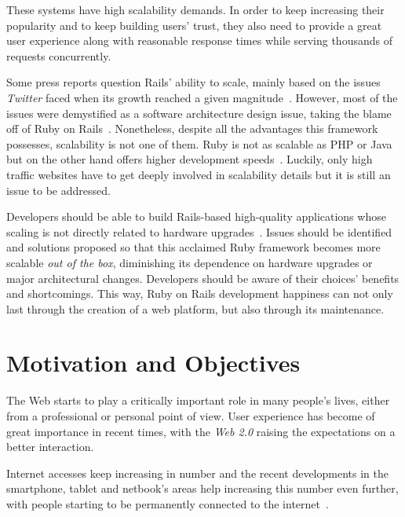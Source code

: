 These systems have high scalability demands. In order to keep increasing their popularity and to keep building users' trust, they also need to provide a great user experience along with reasonable response times while serving thousands of requests concurrently.

Some press reports question Rails' ability to scale, mainly based on the issues \textit{Twitter} faced when its growth reached a given magnitude~\cite{interview_alex_payne}. However, most of the issues were demystified as a software architecture design issue, taking the blame off of Ruby on Rails~\cite{ror_ecosystem_whitepaper}. Nonetheless, despite all the advantages this framework possesses, scalability is not one of them. Ruby is not as scalable as PHP or Java but on the other hand offers higher development speeds~\cite{issues_web_frameworks}. Luckily, only high traffic websites have to get deeply involved in scalability details but it is still an issue to be addressed.

Developers should be able to build Rails-based high-quality applications whose scaling is not directly related to hardware upgrades~\cite{interview_alex_payne}. Issues should be identified and solutions proposed so that this acclaimed Ruby framework becomes more scalable \textit{out of the box}, diminishing its dependence on hardware upgrades or major architectural changes. Developers should be aware of their choices' benefits and shortcomings. This way, Ruby on Rails development happiness can not only last through the creation of a web platform, but also through its maintenance.

\section{Motivation and Objectives} %
\label{sec:motivation_and_objectives}
The Web starts to play a critically important role in many people's lives, either from a professional or personal point of view. User experience has become of great importance in recent times, with the \textit{Web 2.0} raising the expectations on a better interaction.

Internet accesses keep increasing in number and the recent developments in the smartphone, tablet and netbook's areas help increasing this number even further, with people starting to be permanently connected to the internet~\cite{npd:3g,mobileweb,netbooks}.

